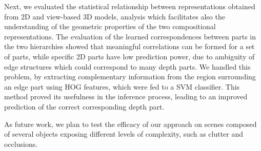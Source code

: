 \documentclass[runningheads]{llncs}
\begin{document}
Next, we evaluated the statistical relationship between representations obtained from 2D and view-based 3D models, analysis which facilitates also the understanding of the geometric properties of the two compositional representations. The evaluation of the learned correspondences between parts in the two hierarchies showed that meaningful correlations can be formed for a set of parts, while specific 2D parts have low prediction power, due to ambiguity of edge structures which could correspond to many depth parts. We handled this problem, by extracting complementary information from the region surrounding an edge part using HOG features, which were fed to a SVM classifier. This method proved its usefulness in the inference process, leading to an improved prediction of the correct corresponding depth part.

As future work, we plan to test the efficacy of our approach on scenes composed of several objects exposing different levels of complexity, such as clutter and occlusions.



\end{document}
